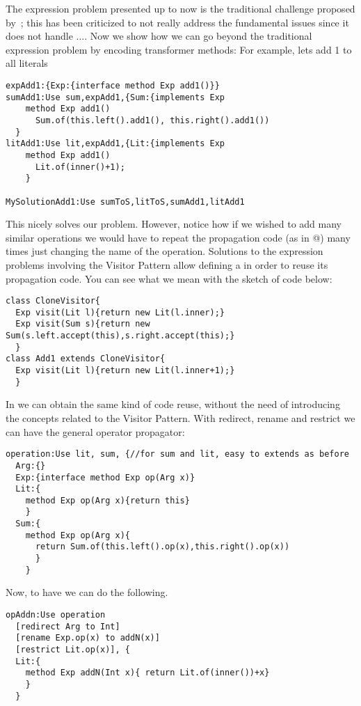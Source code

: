 The expression problem presented up to now is the traditional challenge proposed by~\cite{wadler1998expression};
this has been criticized to not really address the fundamental issues since it does not handle ....
Now we show how we can go beyond the traditional expression problem by encoding transformer methods:
For example, lets add 1 to all literals
\begin{lstlisting}
expAdd1:{Exp:{interface method Exp add1()}}
sumAdd1:Use sum,expAdd1,{Sum:{implements Exp
    method Exp add1()
      Sum.of(this.left().add1(), this.right().add1())
  }
litAdd1:Use lit,expAdd1,{Lit:{implements Exp
    method Exp add1()
      Lit.of(inner()+1);
    }

MySolutionAdd1:Use sumToS,litToS,sumAdd1,litAdd1
\end{lstlisting}

This nicely solves our problem. 
However, notice how if we wished to add many similar operations we would 
have to repeat the propagation code (as in @) many times
just changing the name of the operation.
Solutions to the expression problems involving the  Visitor Pattern 
allow defining a \Q@CloneVisitor@ in order
to reuse its propagation code.
You can see what we mean with the sketch of code below:
\begin{lstlisting}
class CloneVisitor{
  Exp visit(Lit l){return new Lit(l.inner);}
  Exp visit(Sum s){return new Sum(s.left.accept(this),s.right.accept(this);}
  }
class Add1 extends CloneVisitor{
  Exp visit(Lit l){return new Lit(l.inner+1);}
  }
\end{lstlisting}
In \name we can obtain the same kind of code reuse, without the need of introducing 
the concepts related to the Visitor Pattern.
With redirect, rename and restrict we can have the general operator propagator:
\begin{lstlisting}
operation:Use lit, sum, {//for sum and lit, easy to extends as before
  Arg:{}
  Exp:{interface method Exp op(Arg x)}
  Lit:{
    method Exp op(Arg x){return this}
    }
  Sum:{
    method Exp op(Arg x){
      return Sum.of(this.left().op(x),this.right().op(x))
      }
    }
\end{lstlisting}

Now, to have \Q@addN@ we can do the following.

\begin{lstlisting}
opAddn:Use operation
  [redirect Arg to Int]
  [rename Exp.op(x) to addN(x)]
  [restrict Lit.op(x)], {
  Lit:{
    method Exp addN(Int x){ return Lit.of(inner())+x}
    }
  }
\end{lstlisting}  



